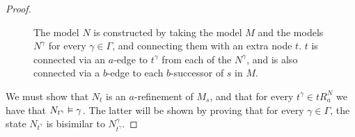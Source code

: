 \begin{proof}
\begin{figure}[H]
\begin{center} %
\caption{
The model $N$ is constructed by taking the model $M$ and the models $N^\gamma$
for every $\gamma \in \Gamma$, and connecting them with an extra node $t$. $t$
is connected via an $a$-edge to $t^\gamma$ from each of the $N^\gamma$, and is
also connected via a $b$-edge to each $b$-successor of $s$ in $M$.
}
\end{center}
\end{figure}

We must show that $N_t$ is an $a$-refinement of $M_s$, and that for every
$t^\gamma \in tR^N_a$ we have that $N_{t^\gamma} \vDash \gamma$. The latter
will be shown by proving that for every $\gamma \in \Gamma$, the state
$N_{t^\gamma}$ is bisimilar to $N^\gamma_{t^\gamma}$.


\end{proof}
